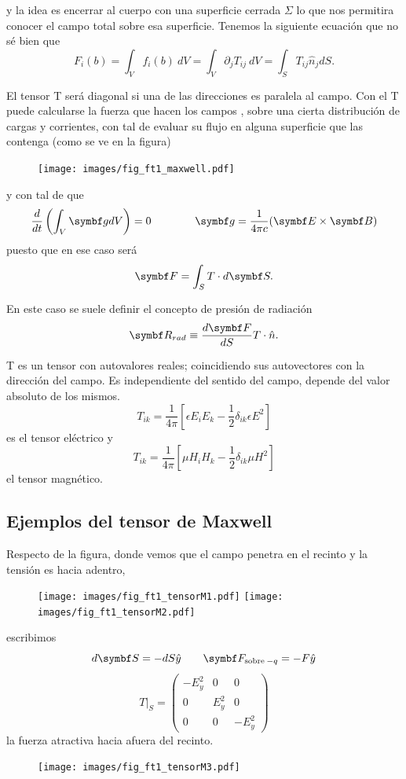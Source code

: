 \documentclass[10pt,oneside]{CBFT_book}
\begin{document}
y la idea es encerrar al cuerpo con una superficie cerrada $\Sigma$ lo que nos permitira conocer
el campo total sobre esa superficie.
Tenemos la siguiente ecuación que no sé bien que
\[
	F_i(b) = \int_V f_i(b) \: dV = \int_V \partial_j T_{ij} \: dV = \int_S T_{ij} \hat{n}_j dS.
\]

El tensor T será diagonal si una de las direcciones es paralela al campo. Con el T puede calcularse
la fuerza que hacen los campos ,  sobre una cierta distribución de cargas y corrientes,
con tal de evaluar su flujo en alguna superficie que las contenga (como se ve en la figura)

\begin{figure}[htb]
	\begin{center}
	\texttt{[image: images/fig\_ft1\_maxwell.pdf]}	 
	\end{center}
	\caption{}
\end{figure} 


y con tal de que 
\[
	\dtot{}{t}\left(\int_V \vb{g} dV \right) = 0 \qquad \qquad \vb{g} =  \frac{1}{4\pi c}(\pv{E}{B})
\]
puesto que en ese caso será
\[
	\vb{F} = \int_S T \cdot d\vb{S}.
\]

En este caso se suele definir el concepto de presión de radiación
\[
	\vb{R}_{rad} \equiv \dtot{\vb{F}}{S} T\cdot\hat{n}.
\]

T es un tensor con autovalores reales; coincidiendo sus autovectores con la dirección del campo.
Es independiente del sentido del campo, depende del valor absoluto de los mismos.
\[
	T_{ik} = \frac{1}{4\pi} \left[ \epsilon E_iE_k - \frac{1}{2}\delta_{ik} \epsilon E^2 \right] 
\]
es el tensor eléctrico y
\[
	T_{ik} = \frac{1}{4\pi} \left[ \mu H_iH_k - \frac{1}{2}\delta_{ik} \mu H^2  \right] 
\]
el tensor magnético.

\subsection{Ejemplos del tensor de Maxwell}

Respecto de la figura, donde vemos que el campo penetra en el recinto y la tensión es hacia adentro,
\begin{figure}[htb]
	\begin{center}
	\texttt{[image: images/fig\_ft1\_tensorM1.pdf]}
	\texttt{[image: images/fig\_ft1\_tensorM2.pdf]}	
	\end{center}
	\caption{}
\end{figure} 
escribimos 
\[
	d\vb{S} = -dS\hat{y} \qquad \vb{F}_{\text{sobre}\:-q} = -F\hat{y}
\]
\[
	T|_S = \begin{pmatrix}
	        -E_y^2	& 0 	& 0 \\
		0	& E_y^2	& 0 \\
		0	& 0	& -E_y^2
	       \end{pmatrix}
\]
la fuerza atractiva hacia afuera del recinto.
\begin{figure}[htb]
	\begin{center}
	\texttt{[image: images/fig\_ft1\_tensorM3.pdf]}	 
	\end{center}
	\caption{}
\end{figure} 
\end{document}
